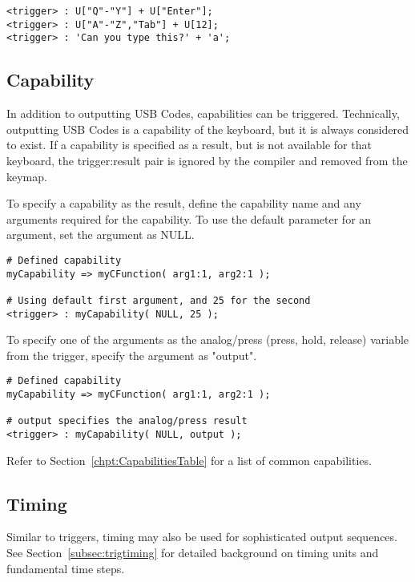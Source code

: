 \documentclass{kiibohd-template}
\begin{document}
\begin{lstlisting}
<trigger> : U["Q"-"Y"] + U["Enter"];
<trigger> : U["A"-"Z","Tab"] + U[12];
<trigger> : 'Can you type this?' + 'a';
\end{lstlisting}


\subsection{Capability}

In addition to outputting USB Codes, capabilities can be triggered.
Technically, outputting USB Codes is a capability of the keyboard, but it is always considered to exist.
If a capability is specified as a result, but is not available for that keyboard, the trigger:result pair is ignored by the compiler and removed from the keymap.

To specify a capability as the result, define the capability name and any arguments required for the capability.
To use the default parameter for an argument, set the argument as NULL.

\begin{lstlisting}
# Defined capability
myCapability => myCFunction( arg1:1, arg2:1 );

# Using default first argument, and 25 for the second
<trigger> : myCapability( NULL, 25 );
\end{lstlisting}

To specify one of the arguments as the analog/press (press, hold, release) variable from the trigger, specify the argument as "output".

\begin{lstlisting}
# Defined capability
myCapability => myCFunction( arg1:1, arg2:1 );

# output specifies the analog/press result
<trigger> : myCapability( NULL, output );
\end{lstlisting}

Refer to Section~\ref{chpt:CapabilitiesTable} for a list of common capabilities.


\subsection{Timing}
\label{subsec:resulttiming}

Similar to triggers, timing may also be used for sophisticated output sequences.
See Section~\ref{subsec:trigtiming} for detailed background on timing units and fundamental time steps.
\end{document}
